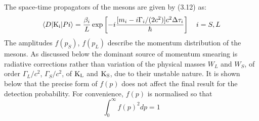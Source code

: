 \documentclass [12pt]{article}
\begin{document}
{    The space-time propagators of the mesons are given by (3.12) as:
      \begin{equation}
   \langle D |{\rm K_i}| Pi  \rangle = \frac{\beta_i}{L}\exp\left[-i \frac{[m_i-i\Gamma_i/(2 c^2)]
    c^2 \Delta \tau_i}{\hbar} \right]~~~i = S,L 
  \end{equation}
    The amplitudes $f(p_S)$,  $f(p_L)$ describe the momentum distribution of the mesons.
    As discussed below the dominant source of momentum smearing is radiative corrections
    rather than variation of the physical masses $W_L$ and $W_S$, of order $\Gamma_L/c^2$, $\Gamma_S/c^2$,
    of ${\rm K_L}$ and ${\rm K_S}$,
   due to their unstable nature. It is shown below that the precise form of  $f(p)$  does not affect the
   final result for the detection probability. For convenience,  $f(p)$ is normalised so that
   \begin{equation}
        \int_{0}^{\infty}f(p)^2 dp = 1
  \end{equation}

}
\end{document}
